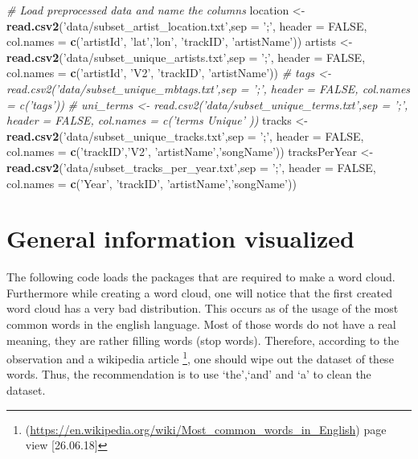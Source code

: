 \documentclass[]{article}
\newenvironment{Shaded}{\begin{snugshade}}{\end{snugshade}}
\newcommand{\KeywordTok}[1]{\textcolor[rgb]{0.13,0.29,0.53}{\textbf{#1}}}
\newcommand{\DataTypeTok}[1]{\textcolor[rgb]{0.13,0.29,0.53}{#1}}
\newcommand{\StringTok}[1]{\textcolor[rgb]{0.31,0.60,0.02}{#1}}
\newcommand{\CommentTok}[1]{\textcolor[rgb]{0.56,0.35,0.01}{\textit{#1}}}
\newcommand{\OtherTok}[1]{\textcolor[rgb]{0.56,0.35,0.01}{#1}}
\newcommand{\NormalTok}[1]{#1}
\let\rmarkdownfootnote\footnote%
\def\footnote{\protect\rmarkdownfootnote}
\begin{document}
\begin{Shaded}
\begin{Highlighting}[]
\CommentTok{# Load preprocessed data and name the columns}
\NormalTok{location <-}\StringTok{ }\KeywordTok{read.csv2}\NormalTok{(}\StringTok{'data/subset_artist_location.txt'}\NormalTok{,}\DataTypeTok{sep =} \StringTok{';'}\NormalTok{, }\DataTypeTok{header =} \OtherTok{FALSE}\NormalTok{, }\DataTypeTok{col.names =} \KeywordTok{c}\NormalTok{(}\StringTok{'artistId'}\NormalTok{, }\StringTok{'lat'}\NormalTok{,}\StringTok{'lon'}\NormalTok{,  }\StringTok{'trackID'}\NormalTok{, }\StringTok{'artistName'}\NormalTok{))}
\NormalTok{artists <-}\StringTok{ }\KeywordTok{read.csv2}\NormalTok{(}\StringTok{'data/subset_unique_artists.txt'}\NormalTok{,}\DataTypeTok{sep =} \StringTok{';'}\NormalTok{, }\DataTypeTok{header =} \OtherTok{FALSE}\NormalTok{, }\DataTypeTok{col.names =} \KeywordTok{c}\NormalTok{(}\StringTok{'artistId'}\NormalTok{, }\StringTok{'V2'}\NormalTok{, }\StringTok{'trackID'}\NormalTok{, }\StringTok{'artistName'}\NormalTok{))}
\CommentTok{# tags <- read.csv2('data/subset_unique_mbtags.txt',sep = ';', header = FALSE, col.names = c('tags'))}
\CommentTok{# uni_terms <- read.csv2('data/subset_unique_terms.txt',sep = ';', header = FALSE, col.names = c('terms Unique' ))}
\NormalTok{tracks <-}\StringTok{ }\KeywordTok{read.csv2}\NormalTok{(}\StringTok{'data/subset_unique_tracks.txt'}\NormalTok{,}\DataTypeTok{sep =} \StringTok{';'}\NormalTok{, }\DataTypeTok{header =} \OtherTok{FALSE}\NormalTok{, }\DataTypeTok{col.names =} \KeywordTok{c}\NormalTok{(}\StringTok{'trackID'}\NormalTok{,}\StringTok{'V2'}\NormalTok{, }\StringTok{'artistName'}\NormalTok{,}\StringTok{'songName'}\NormalTok{))}
\NormalTok{tracksPerYear <-}\StringTok{ }\KeywordTok{read.csv2}\NormalTok{(}\StringTok{'data/subset_tracks_per_year.txt'}\NormalTok{,}\DataTypeTok{sep =} \StringTok{';'}\NormalTok{, }\DataTypeTok{header =} \OtherTok{FALSE}\NormalTok{,  }\DataTypeTok{col.names =} \KeywordTok{c}\NormalTok{(}\StringTok{'Year'}\NormalTok{, }\StringTok{'trackID'}\NormalTok{, }\StringTok{'artistName'}\NormalTok{,}\StringTok{'songName'}\NormalTok{))}
\end{Highlighting}
\end{Shaded}

\section{General information
visualized}\label{general-information-visualized}

The following code loads the packages that are required to make a word
cloud. Furthermore while creating a word cloud, one will notice that the
first created word cloud has a very bad distribution. This occurs as of
the usage of the most common words in the english language. Most of
those words do not have a real meaning, they are rather filling words
(stop words). Therefore, according to the observation and a wikipedia
article \footnote{(\url{https://en.wikipedia.org/wiki/Most_common_words_in_English})
  page view {[}26.06.18{]}}, one should wipe out the dataset of these
words. Thus, the recommendation is to use `the',`and' and `a' to clean
the dataset.
\end{document}
